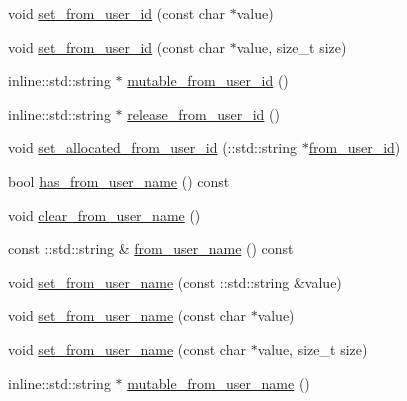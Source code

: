 \begin{DoxyCompactItemize}
\item 
void \hyperlink{class_i_m_1_1_base_define_1_1_client_msg_info_acd710454f6e97d800c94ac6a3104073e}{set\+\_\+from\+\_\+user\+\_\+id} (const char $\ast$value)
\item 
void \hyperlink{class_i_m_1_1_base_define_1_1_client_msg_info_a2737f865dee4b9c788361c40805f0ff1}{set\+\_\+from\+\_\+user\+\_\+id} (const char $\ast$value, size\+\_\+t size)
\item 
inline\+::std\+::string $\ast$ \hyperlink{class_i_m_1_1_base_define_1_1_client_msg_info_a06ce82a15d02954b76b39324b73c03d5}{mutable\+\_\+from\+\_\+user\+\_\+id} ()
\item 
inline\+::std\+::string $\ast$ \hyperlink{class_i_m_1_1_base_define_1_1_client_msg_info_a34ca8b7356b227981ca5909f4506243e}{release\+\_\+from\+\_\+user\+\_\+id} ()
\item 
void \hyperlink{class_i_m_1_1_base_define_1_1_client_msg_info_a11bbf4723035f1deaafc0a68c0b17b1c}{set\+\_\+allocated\+\_\+from\+\_\+user\+\_\+id} (\+::std\+::string $\ast$\hyperlink{class_i_m_1_1_base_define_1_1_client_msg_info_ac24e846f0ccde4847d1dba20386ae484}{from\+\_\+user\+\_\+id})
\item 
bool \hyperlink{class_i_m_1_1_base_define_1_1_client_msg_info_a7574218a312aefc1c08046b0d151bf20}{has\+\_\+from\+\_\+user\+\_\+name} () const 
\item 
void \hyperlink{class_i_m_1_1_base_define_1_1_client_msg_info_a32f65fe91b7c334e586e95585204bd0b}{clear\+\_\+from\+\_\+user\+\_\+name} ()
\item 
const \+::std\+::string \& \hyperlink{class_i_m_1_1_base_define_1_1_client_msg_info_a060e0792835ddff97e357b7a272e2b24}{from\+\_\+user\+\_\+name} () const 
\item 
void \hyperlink{class_i_m_1_1_base_define_1_1_client_msg_info_ab082b867cb2eaf8be391b22026c0351e}{set\+\_\+from\+\_\+user\+\_\+name} (const \+::std\+::string \&value)
\item 
void \hyperlink{class_i_m_1_1_base_define_1_1_client_msg_info_a771462d731dd0e44c95840d2b171d51a}{set\+\_\+from\+\_\+user\+\_\+name} (const char $\ast$value)
\item 
void \hyperlink{class_i_m_1_1_base_define_1_1_client_msg_info_ae1165dc756178cf3cbc35c3d682cba94}{set\+\_\+from\+\_\+user\+\_\+name} (const char $\ast$value, size\+\_\+t size)
\item 
inline\+::std\+::string $\ast$ \hyperlink{class_i_m_1_1_base_define_1_1_client_msg_info_aeede9dd72a54c09a10c2a3d2353ce937}{mutable\+\_\+from\+\_\+user\+\_\+name} ()

\end{DoxyCompactItemize}
